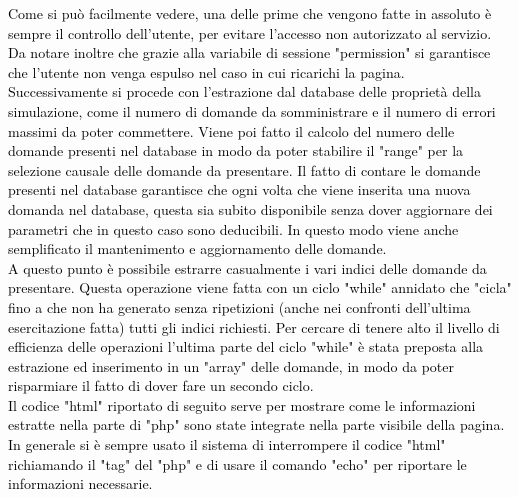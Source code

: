 \textcolor{black}{Come si può facilmente vedere, una delle prime che vengono fatte in assoluto è sempre il controllo dell'utente, per evitare l'accesso non autorizzato al servizio. Da notare inoltre che grazie alla variabile di sessione "permission" si garantisce che l'utente non venga espulso nel caso in cui ricarichi la pagina.\\
Successivamente si procede con l'estrazione dal database delle proprietà della simulazione, come il numero di domande da somministrare e il numero di errori massimi da poter commettere. Viene poi fatto il calcolo del numero delle domande presenti nel database in modo da poter stabilire il "range" per la selezione causale delle domande da presentare. Il fatto di contare le domande presenti nel database garantisce che ogni volta che viene inserita una nuova domanda nel database, questa sia subito disponibile senza dover aggiornare dei parametri che in questo caso sono deducibili. In questo modo viene anche semplificato il mantenimento e aggiornamento delle domande.\\
A questo punto è possibile estrarre casualmente i vari indici delle domande da presentare. Questa operazione viene fatta con un ciclo "while" annidato che "cicla" fino a che non ha generato senza ripetizioni (anche nei confronti dell'ultima esercitazione fatta) tutti gli indici richiesti. Per cercare di tenere alto il livello di efficienza delle operazioni l'ultima parte del ciclo "while" è stata preposta alla estrazione ed inserimento in un "array" delle domande, in modo da poter risparmiare il fatto di dover fare un secondo ciclo.}\\

\textcolor{black}{Il codice "html" riportato di seguito serve per mostrare come le informazioni estratte nella parte di "php" sono state integrate nella parte visibile della pagina. In generale si è sempre usato il sistema di interrompere il codice "html" richiamando il "tag" del "php" e di usare il comando "echo" per riportare le informazioni necessarie.}\\

